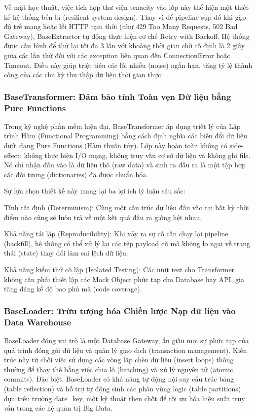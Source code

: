 Về mặt học thuật, việc tích hợp thư viện tenacity vào lớp này thể hiện một thiết kế hệ thống bền bỉ (resilient system design). Thay vì để pipeline sụp đổ khi gặp độ trễ mạng hoặc lỗi HTTP tạm thời (như 429 Too Many Requests, 502 Bad Gateway), BaseExtractor tự động thực hiện cơ chế Retry with Backoff. Hệ thống được cấu hình để thử lại tối đa 3 lần với khoảng thời gian chờ cố định là 2 giây giữa các lần thử đối với các exception liên quan đến ConnectionError hoặc Timeout. Điều này giúp triệt tiêu các lỗi nhiễu (noise) ngắn hạn, tăng tỷ lệ thành công của các chu kỳ thu thập dữ liệu thời gian thực.


\subsubsection{BaseTransformer: Đảm bảo tính Toàn vẹn Dữ liệu bằng Pure Functions}
Trong kỹ nghệ phần mềm hiện đại, BaseTransformer áp dụng triết lý của Lập trình Hàm (Functional Programming) bằng cách định nghĩa các biến đổi dữ liệu dưới dạng Pure Functions (Hàm thuần túy). Lớp này hoàn toàn không có side-effect: không thực hiện I/O mạng, không truy vấn cơ sở dữ liệu và không ghi file. Nó chỉ nhận đầu vào là dữ liệu thô (raw data) và sinh ra đầu ra là một tập hợp các đối tượng (dictionaries) đã được chuẩn hóa.


Sự lựa chọn thiết kế này mang lại ba lợi ích lý luận sâu sắc:


Tính tất định (Determinism): Cùng một cấu trúc dữ liệu đầu vào tại bất kỳ thời điểm nào cũng sẽ luôn trả về một kết quả đầu ra giống hệt nhau.


Khả năng tái lập (Reproducibility): Khi xảy ra sự cố cần chạy lại pipeline (backfill), hệ thống có thể xử lý lại các tệp payload cũ mà không lo ngại về trạng thái (state) thay đổi làm sai lệch dữ liệu.


Khả năng kiểm thử cô lập (Isolated Testing): Các unit test cho Transformer không cần phải thiết lập các Mock Object phức tạp cho Database hay API, gia tăng đáng kể độ bao phủ mã (code coverage).


\subsubsection{BaseLoader: Trừu tượng hóa Chiến lược Nạp dữ liệu vào Data Warehouse}
BaseLoader đóng vai trò là một Database Gateway, ẩn giấu mọi sự phức tạp của quá trình đóng gói dữ liệu và quản lý giao dịch (transaction management). Kiến trúc này từ chối việc sử dụng các vòng lặp chèn dữ liệu (insert loops) thông thường để thay thế bằng việc chia lô (batching) và xử lý nguyên tử (atomic commits). Đặc biệt, BaseLoader có khả năng tự động nội suy cấu trúc bảng (table reflection) và hỗ trợ tự động sinh các phân vùng logic (table partitions) dựa trên trường date\_key, một kỹ thuật then chốt để tối ưu hóa hiệu suất truy vấn trong các hệ quản trị Big Data.

